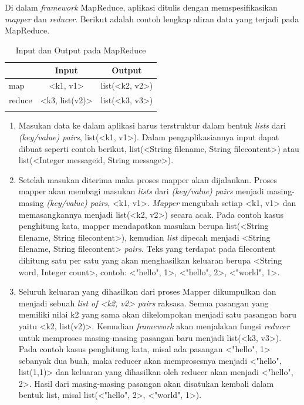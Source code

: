 Di dalam \textit{framework} MapReduce, aplikasi ditulis dengan memspesifikasikan \textit{mapper} dan \textit{reducer}. Berikut adalah contoh lengkap aliran data yang terjadi pada MapReduce.

\begin{table}
	\centering
	\begin{tabular}{l | c | c}
		 & Input & Output \\
	 	\hline
		map & <k1, v1> & list(<k2, v2>) \\
		reduce & <k3, list(v2)> & list(<k3, v3>) \\ 
		\label{tab:mapreduce_process}
	\end{tabular}	
	\caption{Input dan Output pada MapReduce}
\end{table}	

\begin{enumerate}
	\item Masukan data ke dalam aplikasi harus terstruktur dalam bentuk \textit{lists} dari \textit{(key/value) pairs}, list(<k1, v1>). Dalam pengaplikasiannya input dapat dibuat seperti contoh berikut, list(<String filename, String filecontent>) atau list(<Integer messageid, String message>).
	\item Setelah masukan diterima maka proses mapper akan dijalankan. Proses mapper akan membagi masukan \textit{lists} dari \textit{(key/value) pairs} menjadi masing-masing \textit{(key/value) pairs}, <k1, v1>. \textit{Mapper} mengubah setiap <k1, v1> dan memasangkannya menjadi list(<k2, v2>) secara acak. Pada contoh kasus penghitung kata, mapper mendapatkan masukan berupa list(<String filename, String filecontent>), kemudian \textit{list} dipecah menjadi <String filename, String filecontent> \textit{pairs}. Teks yang terdapat pada filecontent dihitung satu per satu yang akan menghasilkan keluaran berupa <String word, Integer count>, contoh: <"hello", 1>, <"hello", 2>, <"world", 1>. 
	\item Seluruh keluaran yang dihasilkan dari proses Mapper dikumpulkan dan menjadi sebuah \textit{list of <k2, v2> pairs} raksasa. Semua pasangan yang memiliki nilai k2 yang sama akan dikelompokan menjadi satu pasangan baru yaitu <k2, list(v2)>. Kemudian \textit{framework} akan menjalakan fungsi \textit{reducer} untuk memproses masing-masing pasangan baru menjadi list(<k3, v3>). Pada contoh kasus penghitung kata, misal ada pasangan <"hello", 1> sebanyak dua buah, maka reducer akan memprosesnya menjadi <"hello", list(1,1)> dan keluaran yang dihasilkan oleh reducer akan menjadi <"hello", 2>. Hasil dari masing-masing pasangan akan disatukan kembali dalam bentuk list, misal list(<"hello", 2>, <"world", 1>).
\end{enumerate} 
	
